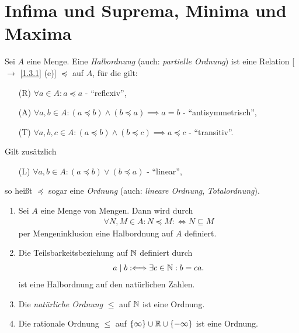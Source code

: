 \documentclass[../../main.tex]{subfiles}
\begin{document}
\section{Infima und Suprema, Minima und Maxima}

\begin{df}\label{12.1.1}
		Sei $A$ eine Menge. Eine \emph{Halbordnung} (auch: \emph{partielle Ordnung}) ist eine Relation [$\to$ \ref{1.3.1} (e)] $\preceq$ auf $A$, für die gilt:
	\begin{itemize}
		\item[(R)] $\forall a\in A: a\preceq a$ - \enquote{reflexiv},
		\item[(A)] $\forall a,b\in A: (a\preceq b)\land (b\preceq a)\implies a=b$ - \enquote{antisymmetrisch},
		\item[(T)] $\forall a,b,c\in A: (a\preceq b)\land (b\preceq c)\implies a\preceq c$ - \enquote{transitiv}.
	\end{itemize}
	Gilt zusätzlich
	\begin{itemize}
		\item[(L)] $\forall a,b\in A: (a\preceq b)\lor (b\preceq a)$ - \enquote{linear},
	\end{itemize}
	so heißt $\preceq$ sogar eine \emph{Ordnung} (auch: \textit{lineare Ordnung}, \emph{Totalordnung}).
\end{df}

\begin{bsp}\label{12.1.2}
	\begin{enumerate}[\normalfont(a)]
		\item Sei $A$ eine Menge von Mengen. Dann wird durch
		\begin{align*}
			\forall N,M\in A: N\preceq M:\Longleftrightarrow N\subseteq M
		\end{align*}
		per Mengeninklusion eine Halbordnung auf $A$ definiert.
		\item Die Teilsbarkeitsbeziehung auf $\mathbb N$ definiert durch
		\begin{align*}
			a\mid b:\Longleftrightarrow \exists c\in \mathbb N: b=ca.
		\end{align*}
		ist eine Halbordnung auf den natürlichen Zahlen.
		\item Die \emph{natürliche Ordnung} $\le$ auf $\mathbb N$ ist eine Ordnung.
		\item Die rationale Ordnung $\le$ auf $\{\infty\}\cup\mathbb R\cup\{-\infty\}$ ist eine Ordnung.
	\end{enumerate}
\end{bsp}
\end{document}

